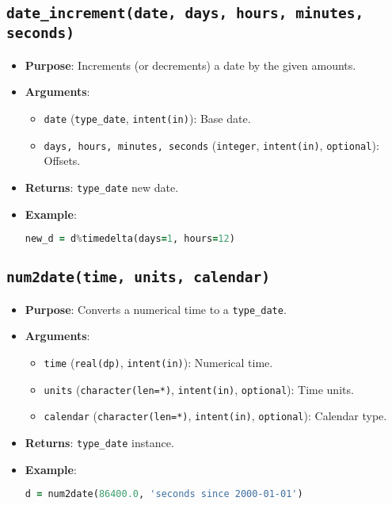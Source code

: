 \documentclass[12pt,a4paper]{report}
\begin{document}
\subsection{\texttt{date\_increment(date, days, hours, minutes, seconds)}}
\begin{itemize}
\item \textbf{Purpose}: Increments (or decrements) a date by the given amounts.
\item \textbf{Arguments}:
\begin{itemize}
\item \texttt{date} (\texttt{type\_date}, \texttt{intent(in)}): Base date.
\item \texttt{days, hours, minutes, seconds} (\texttt{integer}, \texttt{intent(in)}, \texttt{optional}): Offsets.
\end{itemize}
\item \textbf{Returns}: \texttt{type\_date} new date.
\item \textbf{Example}:
\begin{lstlisting}[language=Fortran]
new_d = d%timedelta(days=1, hours=12)
\end{lstlisting}
\end{itemize}

\subsection{\texttt{num2date(time, units, calendar)}}
\begin{itemize}
\item \textbf{Purpose}: Converts a numerical time to a \texttt{type\_date}.
\item \textbf{Arguments}:
\begin{itemize}
\item \texttt{time} (\texttt{real(dp)}, \texttt{intent(in)}): Numerical time.
\item \texttt{units} (\texttt{character(len=*)}, \texttt{intent(in)}, \texttt{optional}): Time units.
\item \texttt{calendar} (\texttt{character(len=*)}, \texttt{intent(in)}, \texttt{optional}): Calendar type.
\end{itemize}
\item \textbf{Returns}: \texttt{type\_date} instance.
\item \textbf{Example}:
\begin{lstlisting}[language=Fortran]
d = num2date(86400.0, 'seconds since 2000-01-01')
\end{lstlisting}
\end{itemize}
\end{document}
